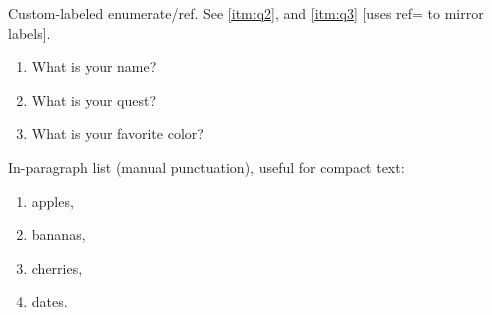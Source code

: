 \noindent Custom-labeled enumerate/ref. See \ref{itm:q2}, and \ref{itm:q3} [uses ref= to mirror labels].
\par
\begin{enumerate}[label=Q\arabic*.,ref=Q\arabic*]
  \item\label{itm:q1} What is your name?
  \item\label{itm:q2} What is your quest?
  \item\label{itm:q3} What is your favorite color?
\end{enumerate}


\noindent In-paragraph list (manual punctuation), useful for compact text:
\par
\begin{enumerate}[label=(\alph*),nosep]
  \item apples, \item bananas, \item cherries, \item dates.
\end{enumerate}